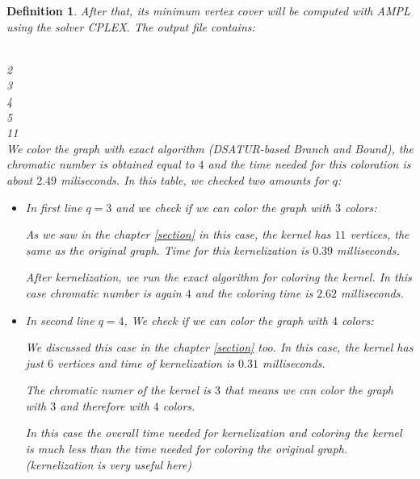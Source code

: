 \documentclass[12pt]{article}
\theoremstyle{slplain}
\newtheorem{defi}{Definition}[section]
\begin{document}
\begin{defi}
After that, its minimum vertex cover will be computed with AMPL using the solver CPLEX. The output file contains:

 \\
2 \\
3 \\
4 \\
5 \\
11 \\


We color the graph with exact algorithm (DSATUR-based Branch and Bound), the chromatic number is obtained equal to $4$ and the time needed for this coloration is about $2.49$ miliseconds.  In this table, we checked two amounts for $q$: 

\begin{itemize}
\item In first line $q = 3$ and we check if we can color the graph with $3$ colors:

As we saw in the chapter \ref{section} in this case, the kernel has $11$ vertices, the same as the original graph. Time for this kernelization is $0.39$ milliseconds. 

After kernelization, we run the exact algorithm for coloring the kernel. In this case chromatic number is again $4$ and the coloring time is $2.62$ milliseconds. 

\item In second line $q = 4$, We check if we can color the graph with $4$ colors:

We discussed this case in the chapter \ref{section} too. In this case, the kernel has just $6$ vertices and time of kernelization is $0.31$ milliseconds.

The chromatic numer of the kernel is $3$ that means we can color the graph with $3$ and therefore with $4$ colors. 

In this case the overall time needed for kernelization and coloring the kernel is much less than the time needed for coloring the original graph. (kernelization is very useful here)
\end{itemize}


\end{defi}
\end{document}
